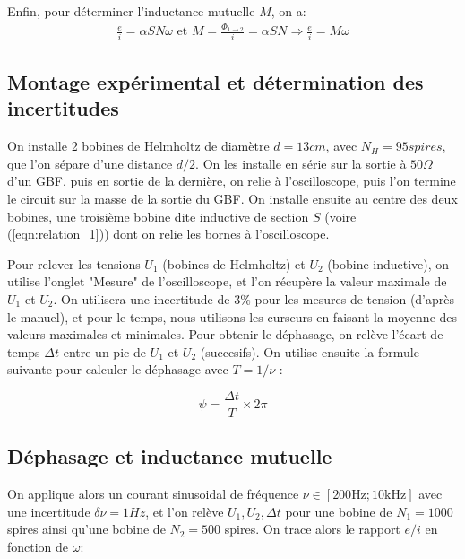 \documentclass[11pt]{article}
\begin{document}
Enfin, pour déterminer l'inductance mutuelle $M$, on a:
\begin{align}
  \label{eqn:relation_M}
  \frac{e}{i} = \alpha S N \omega \text{ et } M = \frac{\Phi_{1 \rightarrow 2}}{ i} = \alpha S N \Rightarrow \frac{e}{i} = M \omega
\end{align}

\subsection{Montage expérimental et détermination des incertitudes}
\label{section:protocole}
On installe 2 bobines de Helmholtz de diamètre $d = 13cm$, avec $N_H = 95 spires$, que l'on sépare d'une distance $d/2$. On les installe en série sur la sortie
à $50\Omega$ d'un GBF, puis en sortie de la dernière, on relie à l'oscilloscope, puis l'on termine le circuit sur la masse de la sortie du GBF. 
On installe ensuite au centre des deux bobines, une troisième bobine dite inductive de section $S$ (voire (\ref{eqn:relation_1})) dont on relie les bornes à l'oscilloscope.

Pour relever les tensions $U_1$ (bobines de Helmholtz) et $U_2$ (bobine inductive), on utilise l'onglet "Mesure" de l'oscilloscope, et l'on récupère la valeur maximale
de $U_1$ et $U_2$. On utilisera une incertitude de $3\%$ pour les mesures de tension (d'après le manuel), et pour le temps, nous utilisons les curseurs en faisant la moyenne des valeurs maximales
et minimales. Pour obtenir le déphasage, on relève l'écart de temps $\Delta t$ entre un pic de $U_1$ et $U_2$ (succesifs). On utilise ensuite la formule suivante pour calculer le déphasage avec $T = 1/\nu$ :

\begin{equation}
    \psi = \frac{\Delta t}{T} \times 2\pi
\end{equation}

\subsection{Déphasage et inductance mutuelle}
On applique alors un courant sinusoidal de fréquence $\nu \in [200\text{Hz}; 10\text{kHz}]$ avec une incertitude $\delta \nu = 1Hz$, et l'on relève $U_1, U_2, \Delta t$ pour une bobine de $N_1 = 1000$ spires ainsi qu'une bobine de $N_2 = 500$ spires. 
On trace alors le rapport $e/i$ en fonction de $\omega$:
\end{document}
